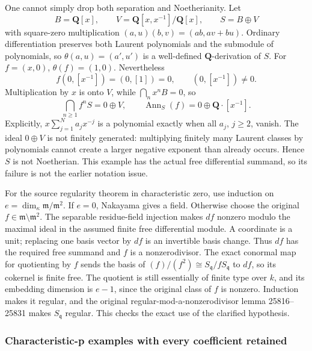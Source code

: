 One cannot simply drop both separation and Noetherianity. Let \[
B=\mathbf Q[x],\qquad
V=\mathbf Q[x,x^{-1}]/\mathbf Q[x],\qquad
S=B\oplus V
\] with square-zero multiplication \((a,u)(b,v)=(ab,av+bu)\). Ordinary differentiation preserves both Laurent polynomials and the submodule of polynomials, so \(\theta(a,u)=(a',u')\) is a well-defined \(\mathbf Q\)-derivation of \(S\). For \(f=(x,0)\), \(\theta(f)=(1,0)\). Nevertheless \[
f(0,[x^{-1}])=(0,[1])=0,\qquad (0,[x^{-1}])\ne0.
\] Multiplication by \(x\) is onto \(V\), while \(\bigcap_nx^nB=0\), so \[
\bigcap_{n\ge1}f^nS=0\oplus V,\qquad
\operatorname{Ann}_S(f)=0\oplus\mathbf Q\cdot[x^{-1}].
\] Explicitly, \(x\sum_{j=1}^N a_jx^{-j}\) is a polynomial exactly when all \(a_j\), \(j\ge2\), vanish. The ideal \(0\oplus V\) is not finitely generated: multiplying finitely many Laurent classes by polynomials cannot create a larger negative exponent than already occurs. Hence \(S\) is not Noetherian. This example has the actual free differential summand, so its failure is not the earlier notation issue.

For the source regularity theorem in characteristic zero, use induction on \(e=\dim_\kappa\mathfrak m/\mathfrak m^2\). If \(e=0\), Nakayama gives a field. Otherwise choose the original \(f\in\mathfrak m\setminus\mathfrak m^2\). The separable residue-field injection makes \(df\) nonzero modulo the maximal ideal in the assumed finite free differential module. A coordinate is a unit; replacing one basis vector by \(df\) is an invertible basis change. Thus \(df\) has the required free summand and \(f\) is a nonzerodivisor. The exact conormal map for quotienting by \(f\) sends the basis of \((f)/(f^2)\cong S_{\mathfrak q}/fS_{\mathfrak q}\) to \(df\), so its cokernel is finite free. The quotient is still essentially of finite type over \(k\), and its embedding dimension is \(e-1\), since the original class of \(f\) is nonzero. Induction makes it regular, and the original regular-mod-a-nonzerodivisor lemma 25816--25831 makes \(S_{\mathfrak q}\) regular. This checks the exact use of the clarified hypothesis.

\subsubsection{Characteristic-p examples with every coefficient retained}\label{algebra-proof-049-characteristic-p-examples-with-every-coefficient-retained}

